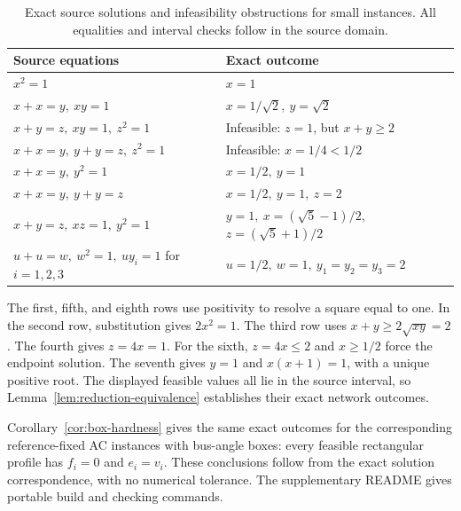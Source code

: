 \begin{table}[htbp]
\centering
\small
\begin{tabular}{@{}p{}p{}@{}}
\toprule
Source equations & Exact outcome \\
\midrule
$x^2=1$ & $x=1$ \\
$x+x=y,\ xy=1$ & $x=1/\sqrt2,\ y=\sqrt2$ \\
$x+y=z,\ xy=1,\ z^2=1$ & Infeasible: $z=1$, but $x+y\ge2$ \\
$x+x=y,\ y+y=z,\ z^2=1$ & Infeasible: $x=1/4<1/2$ \\
$x+x=y,\ y^2=1$ & $x=1/2,\ y=1$ \\
$x+x=y,\ y+y=z$ & $x=1/2,\ y=1,\ z=2$ \\
$x+y=z,\ xz=1,\ y^2=1$ & $y=1,\ x=(\sqrt5-1)/2$,\newline
                                      $z=(\sqrt5+1)/2$ \\
$u+u=w,\ w^2=1,\ uy_i=1$\newline
\hspace*{1em}for $i=1,2,3$
 & $u=1/2,\ w=1,\ y_1=y_2=y_3=2$ \\
\bottomrule
\end{tabular}
\caption{Exact source solutions and infeasibility obstructions for small instances.
All equalities and interval checks follow in the source domain.}
\label{tab:exact-examples}
\end{table}

The first, fifth, and eighth rows use positivity to resolve a square equal
to one. In the second row, substitution gives $2x^2=1$. The third row uses
$x+y\ge2\sqrt{xy}=2$. The fourth gives $z=4x=1$. For the sixth,
$z=4x\le2$ and $x\ge1/2$ force the endpoint solution. The seventh gives
$y=1$ and $x(x+1)=1$, with a unique positive root. The displayed feasible
values all lie in the source interval, so Lemma~\ref{lem:reduction-equivalence}
establishes their exact network outcomes.

Corollary~\ref{cor:box-hardness} gives the same exact outcomes for the
corresponding reference-fixed AC instances with bus-angle boxes: every
feasible rectangular profile has $f_i=0$ and $e_i=v_i$. These conclusions
follow from the exact solution correspondence, with no numerical
tolerance. The supplementary README gives portable build and checking
commands.

